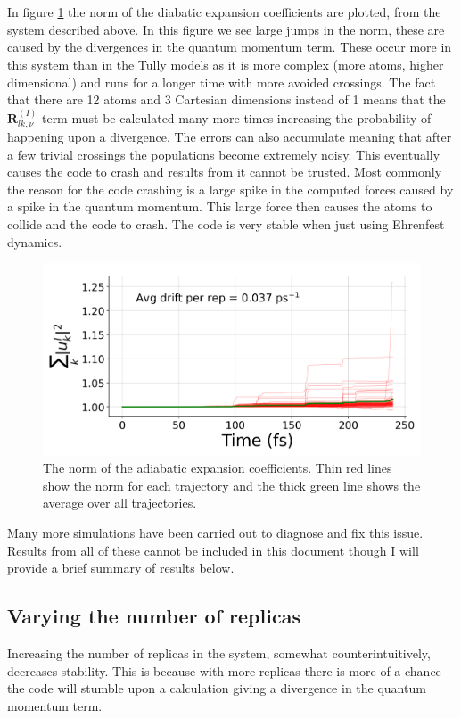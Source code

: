\\\\
In figure \ref{fig:CP2K_norm} the norm of the diabatic expansion coefficients are plotted, from the system described above. In this figure we see large jumps in the norm, these are caused by the divergences in the quantum momentum term. These occur more in this system than in the Tully models as it is more complex (more atoms, higher dimensional) and runs for a longer time with more avoided crossings. The fact that there are 12 atoms and 3 Cartesian dimensions instead of 1 means that the $\mathbf{R}_{lk, \nu}^{(I)}$ term must be calculated many more times increasing the probability of happening upon a divergence. The errors can also accumulate meaning that after a few trivial crossings the populations become extremely noisy. This eventually causes the code to crash and results from it cannot be trusted. Most commonly the reason for the code crashing is a large spike in the computed forces caused by a spike in the quantum momentum. This large force then causes the atoms to collide and the code to crash. The code is very stable when just using Ehrenfest dynamics.
\begin{figure}[ht]
  \includegraphics[width=\textwidth]{./img/CTMQC/Ethylene_norm.png}
  \caption{\label{fig:CP2K_norm}The norm of the adiabatic expansion coefficients. Thin red lines show the norm for each trajectory and the thick green line shows the average over all trajectories.}
\end{figure}
Many more simulations have been carried out to diagnose and fix this issue. Results from all of these cannot be included in this document though I will provide a brief summary of results below.
\\
\subsection{Varying the number of replicas}
Increasing the number of replicas in the system, somewhat counterintuitively, decreases stability. This is because with more replicas there is more of a chance the code will stumble upon a calculation giving a divergence in the quantum momentum term.
\\
